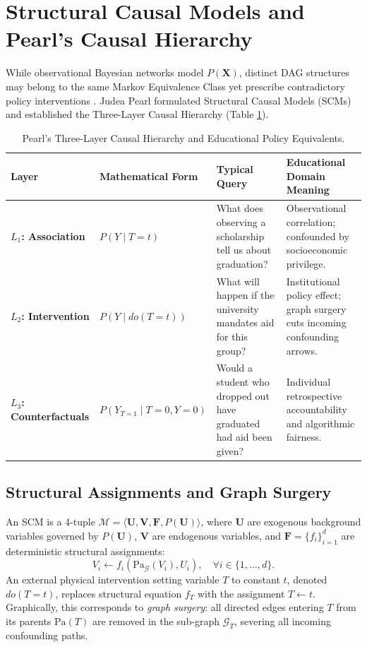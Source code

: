 \section{Structural Causal Models and Pearl's Causal Hierarchy}
\label{sec:bg_scm}

While observational Bayesian networks model $P(\mathbf{X})$, distinct DAG structures may belong to the same Markov Equivalence Class yet prescribe contradictory policy interventions \parencite{pearl2009causality}. Judea Pearl formulated Structural Causal Models (SCMs) and established the Three-Layer Causal Hierarchy (Table \ref{tab:causal_hierarchy}).

\begin{table}[htbp]
    \centering
    \small
    \caption{Pearl's Three-Layer Causal Hierarchy and Educational Policy Equivalents.}
    \label{tab:causal_hierarchy}
    \begin{tabularx}{\textwidth}{p{2.2cm}p{3.2cm}p{4.2cm}X}
        \toprule
        \textbf{Layer} & \textbf{Mathematical Form} & \textbf{Typical Query} & \textbf{Educational Domain Meaning} \\
        \midrule
        \textbf{$L_1$: Association} & $P(Y \mid T=t)$ & What does observing a scholarship tell us about graduation? & Observational correlation; confounded by socioeconomic privilege. \\
        \textbf{$L_2$: Intervention} & $P(Y \mid do(T=t))$ & What will happen if the university mandates aid for this group? & Institutional policy effect; graph surgery cuts incoming confounding arrows. \\
        \textbf{$L_3$: Counterfactuals} & $P(Y_{T=1} \mid T=0, Y=0)$ & Would a student who dropped out have graduated had aid been given? & Individual retrospective accountability and algorithmic fairness. \\
        \bottomrule
    \end{tabularx}
\end{table}

\subsection{Structural Assignments and Graph Surgery}

An SCM is a 4-tuple $\mathcal{M} = \langle \mathbf{U}, \mathbf{V}, \mathbf{F}, P(\mathbf{U}) \rangle$, where $\mathbf{U}$ are exogenous background variables governed by $P(\mathbf{U})$, $\mathbf{V}$ are endogenous variables, and $\mathbf{F} = \{f_i\}_{i=1}^d$ are deterministic structural assignments:
\begin{equation}
    V_i \leftarrow f_i(\text{Pa}_{\mathcal{G}}(V_i), U_i), \quad \forall i \in \{1, \dots, d\}.
    \label{eq:scm_assignment}
\end{equation}
An external physical intervention setting variable $T$ to constant $t$, denoted $do(T=t)$, replaces structural equation $f_T$ with the assignment $T \leftarrow t$. Graphically, this corresponds to \textit{graph surgery}: all directed edges entering $T$ from its parents $\text{Pa}(T)$ are removed in the sub-graph $\mathcal{G}_{\overline{T}}$, severing all incoming confounding paths.

